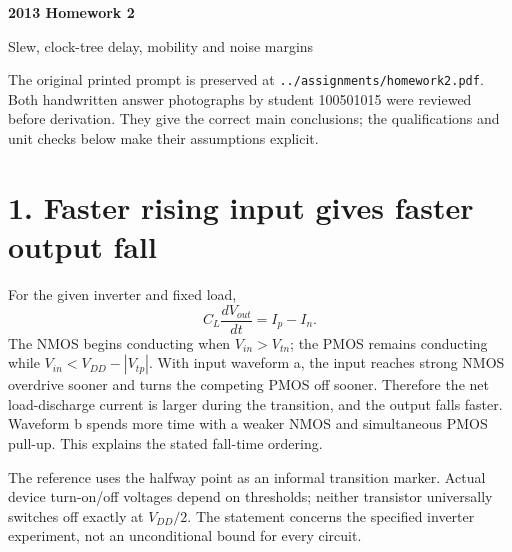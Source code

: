 \documentclass[11pt,a4paper]{article}
\begin{document}
\begin{center}{\Large\bfseries 2013 Homework 2}\par Slew, clock-tree delay, mobility and noise margins\end{center}
The original printed prompt is preserved at \texttt{../assignments/homework2.pdf}.
Both handwritten answer photographs by student 100501015 were reviewed before
derivation. They give the correct main conclusions; the qualifications and
unit checks below make their assumptions explicit.

\section*{1. Faster rising input gives faster output fall}
For the given inverter and fixed load,
\[
 C_L\frac{dV_{out}}{dt}=I_p-I_n.
\]
The NMOS begins conducting when $V_{in}>V_{tn}$; the PMOS remains conducting
while $V_{in}<V_{DD}-|V_{tp}|$. With input waveform a, the input reaches strong
NMOS overdrive sooner and turns the competing PMOS off sooner. Therefore the
net load-discharge current is larger during the transition, and the output
falls faster. Waveform b spends more time with a weaker NMOS and simultaneous
PMOS pull-up. This explains the stated fall-time ordering.

\begin{center}\end{center}
The reference uses the halfway point as an informal transition marker.
Actual device turn-on/off voltages depend on thresholds; neither transistor
universally switches off exactly at $V_{DD}/2$. The statement concerns the
specified inverter experiment, not an unconditional bound for every circuit.
\end{document}
